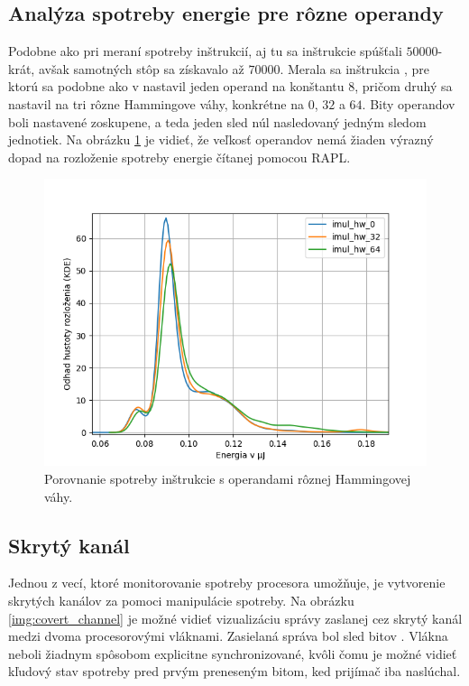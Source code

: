 \subsection{Analýza spotreby energie pre rôzne operandy}
Podobne ako pri meraní spotreby inštrukcií, aj tu sa inštrukcie spúšťali $50000$-krát, avšak samotných stôp sa získavalo až $70000$.
Merala sa inštrukcia , pre ktorú sa podobne ako v \cite{Platypus} nastavil jeden operand na konštantu $8$, pričom druhý
sa nastavil na tri rôzne Hammingove váhy, konkrétne na $0$, $32$ a $64$. Bity operandov boli nastavené zoskupene, a teda jeden sled núl nasledovaný jedným sledom
jednotiek. Na obrázku \ref{img:imul_operands} je vidieť, že veľkosť operandov nemá žiaden výrazný dopad na rozloženie spotreby energie čítanej pomocou RAPL.

\begin{figure}\label{img:imul_operands}
  \centering
  \includegraphics[scale=0.7]{./obrazky-figures/imul_operand_consumption.png}
  \caption{Porovnanie spotreby inštrukcie  s operandami rôznej Hammingovej váhy.}
\end{figure}

\subsection{Skrytý kanál}
Jednou z vecí, ktoré monitorovanie spotreby procesora umožňuje, je vytvorenie skrytých kanálov za pomoci manipulácie spotreby. Na obrázku \ref{img:covert_channel}
je možné vidieť vizualizáciu správy zaslanej cez skrytý kanál medzi dvoma procesorovými vláknami. Zasielaná správa bol sled bitov .
Vlákna neboli žiadnym spôsobom explicitne synchronizované, kvôli čomu je možné vidieť kľudový stav spotreby pred prvým preneseným bitom, ked prijímač iba naslúchal.

